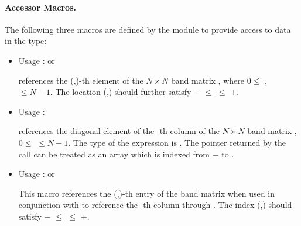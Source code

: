 \paragraph{Accessor Macros.}
The following three macros are defined by the {\band} module to provide
access to data in the  type:
\begin{itemize}
\item {}
  \par Usage :  or 
  \par {} references the (,)-th element of the
  $N \times N$ band matrix , where $0 \le$ ,  $\le N-1$.
  The location (,) should further satisfy 
  $-$ $\le$  $\le$ $+$.
\item {}
  \par Usage : 
  \par {} references the diagonal element of the -th
  column of the $N \times N$ band matrix , $0 \le$  $\le N-1$.
  The type of the expression  is . 
  The pointer returned by the call  can be treated as 
  an array which is indexed from $-$ to .
\item {}
  \par Usage :  or
  \par This macro references the (,)-th entry of the band matrix 
  when used in conjunction with  to reference the -th column through
  . The index (,) should satisfy 
  $-$ $\le$  $\le$ $+$.
\end{itemize}

